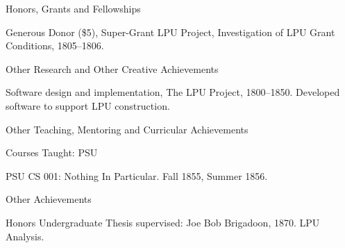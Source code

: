 \documentclass{psu-vita}
\begin{document}
%
%
\begin{majorhead}{Honors, Grants and Fellowships}
  \item Generous Donor (\$5), Super-Grant LPU Project,
        Investigation of LPU Grant Conditions, 1805--1806.
\end{majorhead} 
%
\begin{majorhead}{Other Research and Other Creative Achievements}
  \item Software design and implementation,
        The LPU Project, 1800--1850.  Developed 
        software to support LPU construction.
\end{majorhead}
%
\begin{majorhead}{Other Teaching, Mentoring and Curricular Achievements}
  \begin{minorhead}{Courses Taught: PSU}
    \item PSU CS 001: Nothing In Particular. Fall 1855,
      Summer 1856.
  \end{minorhead}
%
%
  \begin{minorhead}{Other Achievements}
    \item Honors Undergraduate Thesis supervised: Joe Bob
      Brigadoon, 1870. LPU Analysis.
  \end{minorhead}
\end{majorhead}
\end{document}
